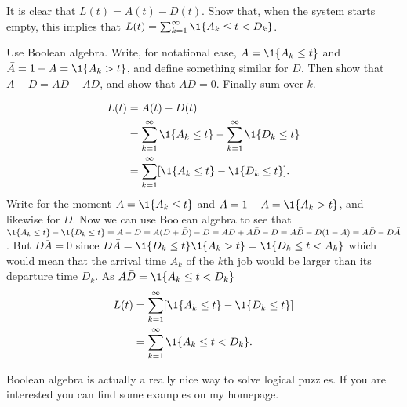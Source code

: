 \begin{exercise} It is clear  that $L(t) = A(t)-D(t)$. Show that, when the system starts empty, this implies that
$L(t) = \sum_{k=1}^\infty \1{A_k \leq t < D_k}$.
  \begin{hint}
  Use Boolean algebra.  Write, for notational ease,
    $A=\1{A_k \leq t}$ and $\bar A = 1- A = \1{A_k > t}$, and define
    something similar for $D$.  Then show that
    $A - D = A \bar D - \bar A D$, and show that $\bar A D
    =0$. Finally sum over $k$.
  \end{hint}

\begin{solution}
  \begin{equation*}
    \begin{split}
      L(t)
&= A(t) - D(t) \\
&= \sum_{k=1}^\infty \1{A_k \leq t} -  \sum_{k=1}^\infty \1{D_k \leq t} \\
&= \sum_{k=1}^\infty [\1{A_k \leq t} -  \1{D_k \leq t}].
    \end{split}
  \end{equation*}
  Write for the moment $A=\1{A_k \leq t}$ and
  $\bar A = 1- A = \1{A_k > t}$, and likewise for $D$. Now we can use
  Boolean algebra to see that
  $\1{A_k \leq t} - \1{D_k \leq t} = A-D = A(D+\bar D) -D = AD +
  A\bar D - D = A\bar D - D(1-A) = A\bar D - D \bar A$.
  But $D \bar A = 0$ since
  $D \bar A = \1{D_k \leq t} \1{A_k > t} = \1{D_k \leq t < A_k}$
  which would mean that the arrival time $A_k$ of the $k$th job would
  be larger than its departure time $D_k$. As $A \bar D = \1{A_k \leq t < D_k}$
  \begin{equation*}
    \begin{split}
      L(t)
&= \sum_{k=1}^\infty [\1{A_k \leq t} -  \1{D_k \leq t}] \\
&= \sum_{k=1}^\infty \1{A_k \leq t < D_k}.
    \end{split}
  \end{equation*}

  Boolean algebra is actually a really nice way to solve logical
  puzzles. If you are interested you can find some examples on my
  homepage. 
\end{solution}

\end{exercise}


